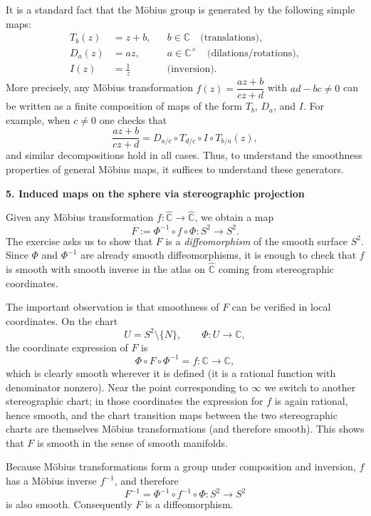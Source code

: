 \begin{solution}
	
	It is a standard fact that the M\"{o}bius group is generated by the following
	simple maps:
	\begin{align*}
		T_b(z) &= z + b, && b\in\mathbb{C} \quad\text{(translations)},\\
		D_a(z) &= a z,   && a\in\mathbb{C}^{\times}\quad\text{(dilations/rotations)},\\
		I(z)   &= \frac{1}{z}                     &&\text{(inversion)}.
	\end{align*}
	More precisely, any M\"{o}bius transformation $f(z)=\dfrac{az+b}{cz+d}$ with
	$ad-bc\neq 0$ can be written as a finite composition of maps of the form
	$T_b$, $D_a$, and $I$.  For example, when $c\neq 0$ one checks that
	\[
	\frac{az+b}{cz+d} =
	D_{a/c}\circ T_{d/c}\circ I\circ T_{b/a}(z),
	\]
	and similar decompositions hold in all cases.  Thus, to understand the
	smoothness properties of general M\"{o}bius maps, it suffices to understand
	these generators.
	
	\par\medskip\noindent\textbf{5. Induced maps on the sphere via stereographic projection}\par\smallskip

	
	Given any M\"{o}bius transformation
	$f:\widehat{\mathbb{C}}\to\widehat{\mathbb{C}}$, we obtain a map
	\[
	F := \Phi^{-1}\circ f\circ\Phi : S^{2} \longrightarrow S^{2}.
	\]
	The exercise asks us to show that $F$ is a \emph{diffeomorphism} of the
	smooth surface $S^{2}$.  Since $\Phi$ and $\Phi^{-1}$ are already smooth
	diffeomorphisms, it is enough to check that $f$ is smooth with smooth
	inverse in the atlas on $\widehat{\mathbb{C}}$ coming from stereographic
	coordinates.
	
	The important observation is that smoothness of $F$ can be verified in
	local coordinates.  On the chart
	\[
	U = S^{2}\setminus\{N\},\qquad \Phi:U\to\mathbb{C},
	\]
	the coordinate expression of $F$ is
	\[
	\Phi\circ F\circ\Phi^{-1} = f:\mathbb{C}\to\mathbb{C},
	\]
	which is clearly smooth wherever it is defined (it is a rational function
	with denominator nonzero).  Near the point corresponding to $\infty$ we
	switch to another stereographic chart; in those coordinates the expression
	for $f$ is again rational, hence smooth, and the chart transition maps
	between the two stereographic charts are themselves M\"{o}bius transformations
	(and therefore smooth).  This shows that $F$ is smooth in the sense of
	smooth manifolds.
	
	Because M\"{o}bius transformations form a group under composition and inversion,
	$f$ has a M\"{o}bius inverse $f^{-1}$, and therefore
	\[
	F^{-1} = \Phi^{-1}\circ f^{-1}\circ \Phi : S^{2}\to S^{2}
	\]
	is also smooth.  Consequently $F$ is a diffeomorphism.
	

\end{solution}
